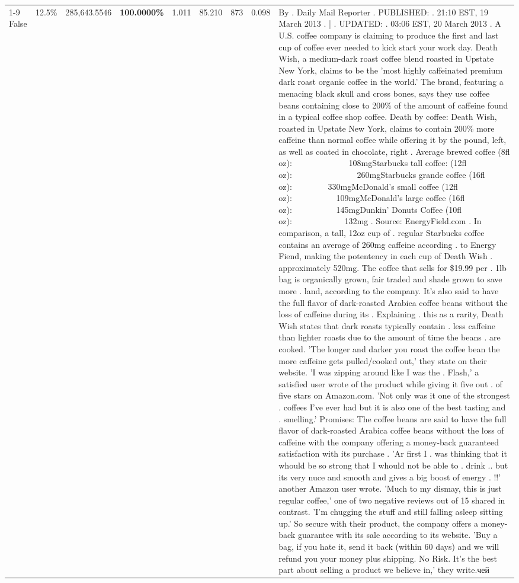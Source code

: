 \begin{table}[H]
{\begin{tabular}{lllrlllll}
\cline{1-9} \cline{2-9}
False & 12.5\% & 285,643.5546 & \bfseries \color{red} 100.0000\% & 1.011 & 85.210 & 873 & 0.098 & By . Daily Mail Reporter . PUBLISHED: . 21:10 EST, 19 March 2013 . | . UPDATED: . 03:06 EST, 20 March 2013 . A U.S. coffee company is claiming to produce the first and last cup of coffee ever needed to kick start your work day. Death Wish, a medium-dark roast coffee blend roasted in Upstate New York, claims to be the 'most highly caffeinated premium dark roast organic coffee in the world.' The brand, featuring a menacing black skull and cross bones, says they use coffee beans containing close to 200\% of the amount of caffeine found in a typical coffee shop coffee. Death by coffee: Death Wish, roasted in Upstate New York, claims to contain 200\% more caffeine than normal coffee while offering it by the pound, left, as well as coated in chocolate, right . Average brewed coffee (8fl oz):              108mgStarbucks tall coffee: (12fl oz):                260mgStarbucks grande coffee (16fl oz):         330mgMcDonald's small coffee (12fl oz):           109mgMcDonald's large coffee (16fl oz):           145mgDunkin' Donuts Coffee (10fl oz):             132mg . Source: EnergyField.com . In comparison, a tall, 12oz cup of . regular Starbucks coffee contains an average of 260mg caffeine according . to Energy Fiend, making the potentency in each cup of Death Wish . approximately 520mg. The coffee that sells for \$19.99 per . 1lb bag is organically grown, fair traded and shade grown to save more . land, according to the company. It's also said to have the full flavor of dark-roasted Arabica coffee beans without the loss of caffeine during its . Explaining . this as a rarity, Death Wish states that dark roasts typically contain . less caffeine than lighter roasts due to the amount of time the beans . are cooked. 'The longer and darker you roast the coffee bean the more caffeine gets pulled/cooked out,' they state on their website. 'I was zipping around like I was the . Flash,' a satisfied user wrote of the product while giving it five out . of five stars on Amazon.com. 'Not only was it one of the strongest . coffees I've ever had but it is also one of the best tasting and . smelling.’ Promises: The coffee beans are said to have the full flavor of dark-roasted Arabica coffee beans without the loss of caffeine with the company offering a money-back guaranteed satisfaction with its purchase . 'Ar first I . was thinking that it whould be so strong that I whould not be able to . drink .. but its very nuce and smooth and gives a big boost of energy . !!' another Amazon user wrote. 'Much to my dismay, this is just regular coffee,' one of two negative reviews out of 15 shared in contrast. 'I'm chugging the stuff and still falling asleep sitting up.' So secure with their product, the company offers a money-back guarantee with its sale according to its website. 'Buy a bag, if you hate it, send it back (within 60 days) and we will refund you your money plus shipping. No Risk. It’s the best part about selling a product we believe in,' they write.чей \\

\end{tabular}}
\end{table}
